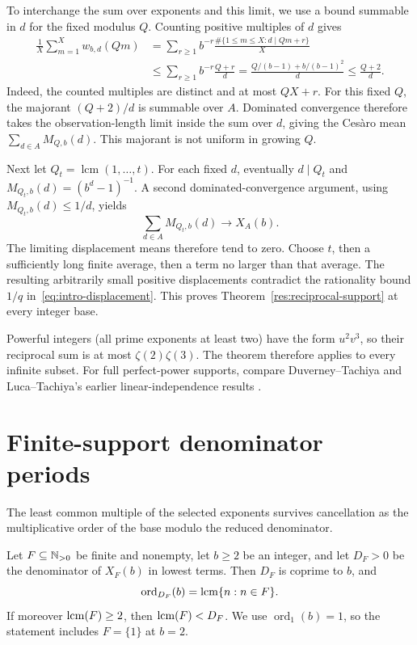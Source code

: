 \documentclass[11pt]{article}
\begin{document}
To interchange the sum over exponents and this limit, we use a bound
summable in $d$ for the fixed modulus $Q$.  Counting positive multiples of $d$ gives
\begin{align*}
 \frac1X\sum_{m=1}^Xw_{b,d}(Qm)
 &=\sum_{r\ge1}b^{-r}
       \frac{\#\{1\le m\le X:d\mid Qm+r\}}X\\
 &\le\sum_{r\ge1}b^{-r}\frac{Q+r}{d}
 =\frac{Q/(b-1)+b/(b-1)^2}{d}\le\frac{Q+2}{d}.
\end{align*}
Indeed, the counted multiples are distinct and at most $QX+r$.
For this fixed $Q$, the majorant $(Q+2)/d$ is summable over $A$.
Dominated convergence therefore takes the observation-length limit inside
the sum over $d$, giving the Ces\`aro mean
$\sum_{d\in A}M_{Q,b}(d)$.  This majorant is not uniform in growing $Q$.

Next let $Q_t=\operatorname{lcm}(1,\ldots,t)$.
For each fixed $d$, eventually $d\mid Q_t$ and
$M_{Q_t,b}(d)=(b^d-1)^{-1}$.  A second dominated-convergence argument,
using $M_{Q_t,b}(d)\le1/d$, yields
\begin{equation}
 \sum_{d\in A}M_{Q_t,b}(d)\longrightarrow X_A(b).
 \label{eq:lcm-prefix-orbit-limit}
\end{equation}
The limiting displacement means therefore tend to zero. Choose $t$,
then a sufficiently long finite average, then a term no larger than that
average. The resulting arbitrarily small positive displacements contradict
the rationality bound $1/q$ in~\eqref{eq:intro-displacement}. This proves
Theorem~\ref{res:reciprocal-support} at every integer base.

Powerful integers (all prime exponents at least two) have the form
$u^2v^3$, so their reciprocal sum is at most $\zeta(2)\zeta(3)$.
The theorem therefore applies to every infinite subset. For full
perfect-power supports, compare Duverney--Tachiya
\cite[Corollary~1.2, p.~4]{duverneytachiya} and Luca--Tachiya's earlier
linear-independence results \cite{lucatachiya2014independence}.

\section{Finite-support denominator periods}\label{sec:period}

The least common multiple of the selected exponents survives cancellation
as the multiplicative order of the base modulo the reduced denominator.

\begin{theorem}\label{res:period}
Let $F\subseteq\mathbb{N}_{>0}$ be finite and nonempty, let $b\ge2$ be an integer, and
let $D_F>0$ be the denominator of $X_F(b)$ in lowest terms.  Then $D_F$ is
coprime to $b$, and
\[
  \operatorname{ord}_{D_F}(b)=\operatorname{lcm}\{n:n\in F\}.
\]
If moreover $\operatorname{lcm}(F)\ge2$, then $\operatorname{lcm}(F)<D_F$.  We use
$\operatorname{ord}_1(b)=1$, so the statement includes $F=\{1\}$
at $b=2$.
\end{theorem}
\end{document}
